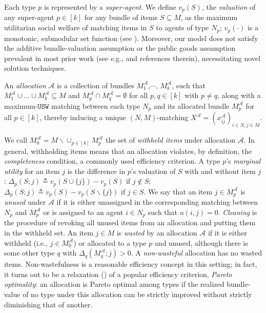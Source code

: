 \documentclass[11pt,dvipdfmx]{article}
\newcommand{\USW}{\mathtt{USW}}
\begin{document}
Each type $p$ is represented by a {\em super-agent}. We define $v_p(S)$, the \emph{valuation} of any super-agent $p \in [k]$ for any bundle of items $S \subseteq M$, as the maximum utilitarian social welfare of matching items in $S$ to agents of type $N_p$; $v_p(\cdot)$ is a monotonic, submodular set function (see \cite[Theorem 1]{benabbou2019fairness}). 
Moreover, our model does not satisfy the additive bundle-valuation assumption or the public goods assumption prevalent in most prior work (see e.g., \cite{caragiannis2016unreasonable,barman2018greedy,aleksandrov2018group,segal2018democratic} and references therein), necessitating novel solution techniques.
\begin{definition}[Allocation]\label{defn:alloc}
	An \emph{allocation} $\mathcal{A}$ is a collection of bundles $M^\mathcal{A}_1$,$ \cdots$, $M^\mathcal{A}_k$, such that $M^\mathcal{A}_1 \cup \ldots \cup M^\mathcal{A}_k \subseteq M$ and $M^\mathcal{A}_p \cap M^\mathcal{A}_q = \emptyset$ for all $p,q \in [k]$ with $p \neq q$, along with a maximum-$\USW$ matching between each type $N_p$ and its allocated bundle $M^\mathcal{A}_p$ for all $p \in [k]$, thereby inducing a unique $(N,M)$-matching $X^{\mathcal{A}} = (x^{\mathcal{A}}_{ij} )_{i \in N, j \in M}$.
\end{definition}
We call $M^\mathcal{A}_0 = M \backslash \cup_{p\in [k]} M^\mathcal{A}_p$ the set of \emph{withheld items} under allocation $\mathcal{A}$. In general, withholding items means that an allocation violates, by definition, the \emph{completeness} condition, a commonly used efficiency criterion. 
A type $p$'s \emph{marginal utility} for an item $j$ is the difference in $p$'s valuation of $S$ with and without item $j$: $\Delta_p(S;j) \triangleq v_p(S \cup \{j\}) - v_p(S)$ if $j \notin S$; $\Delta_p(S;j) \triangleq v_p(S) - v_p(S \backslash \{j\})$ if $j \in S$.
We say that an item $j \in M^\mathcal{A}_p$ is \emph{unused} under $\mathcal{A}$ if it is either unassigned in the corresponding matching between $N_p$ and $M^\mathcal{A}_p$ or is assigned to an agent $i \in N_p$ such that $u(i,j)=0$. \emph{Cleaning} is the procedure of revoking all unused items from an allocation and putting them in the withheld set.
An item $j \in M$ is \emph{wasted} by an allocation $\mathcal{A}$ if it is either withheld (i.e., $j \in M^\mathcal{A}_0$) or allocated to a type $p$ and unused, although there is some other type $q$ with $\Delta_q(M^\mathcal{A}_q;j) > 0$. A {\em non-wasteful} allocation has no wasted items. Non-wastefulness is a reasonable efficiency concept in this setting; in fact, it turns out to be a relaxation (\cite[Lemma 1]{benabbou2019fairness}) of a popular efficiency criterion, \emph{Pareto optimality}: an allocation is Pareto optimal among types if the realized bundle-value of no type under this allocation can be strictly improved without strictly diminishing that of another.
\end{document}
